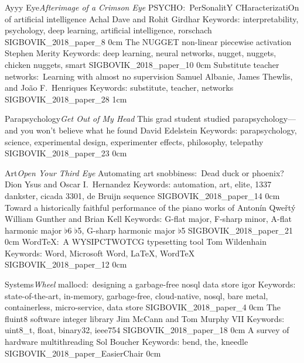 \addtrack
	{Ayyy Eye}{\textit{Afterimage of a Crimson Eye}}
\addpaper
	{PSYCHO:\ PerSonalitY CHaracterizatiOn of artificial intelligence}
	{Achal Dave and Rohit Girdhar}
	{Keywords: interpretability, psychology, deep learning, artificial intelligence, rorschach}
	{SIGBOVIK_2018_paper_8}
	{0cm}
	{}
\addpaper
	{The NUGGET non-linear piecewise activation}
	{Stephen Merity}
	{Keywords: deep learning, neural networks, nugget, nuggets, chicken nuggets, smart}
	{SIGBOVIK_2018_paper_10}
	{0cm}
	{}
\setlength{\evensidemargin}{0cm}
\addpaper
	{Substitute teacher networks:\ Learning with almost no supervision}
	{Samuel Albanie, James Thewlis, and Jo\~ao F.\ Henriques}
	{Keywords: substitute, teacher, networks}
	{SIGBOVIK_2018_paper_28}
	{1cm}
	{}
\setlength{\evensidemargin}{\mainevensidemargin}

\addtrack
	{Parapsychology}{\textit{Get Out of My Head}}
\addpaper
	{This grad student studied parapsychology---and you won't believe what he found}
	{David Edelstein}
	{Keywords: parapsychology, science, experimental design, experimenter effects, philosophy, telepathy}
	{SIGBOVIK_2018_paper_23}
	{0cm}
	{}

\addtrack
	{Art}{\textit{Open Your Third Eye}}
\addpaper
	{Automating art snobbiness:\ Dead duck or phoenix?}
	{Dion Ysus and Oscar I.\ Hernandez}
	{Keywords: automation, art, elite, 1337 dankster, cicada 3301, de Bruijn sequence}
	{SIGBOVIK_2018_paper_14}
	{0cm}
	{}
\addpaper
	{Toward a historically faithful performance of the piano works of Anton\'in Qwe\v{r}t\'y}
	{William Gunther and Brian Kell}
	{Keywords: G-flat major, F-sharp minor, A-flat harmonic major $\flat$6 $\flat$5, G-sharp harmonic major $\flat$5}
	{SIGBOVIK_2018_paper_21}
	{0cm}
	{}
\addpaper
	{WordTeX:\ A WYSIPCTWOTCG typesetting tool}
	{Tom Wildenhain}
	{Keywords: Word, Microsoft Word, LaTeX, WordTeX}
	{SIGBOVIK_2018_paper_12}
	{0cm}
	{}


\addtrack
	{Systems}{\textit{Wheel}}
\addpaper
	{mallocd:\ designing a garbage-free nosql data store}
	{igor}
	{Keywords: state-of-the-art, in-memory, garbage-free, cloud-native, nosql, bare metal, containerless, micro-service, data store}
	{SIGBOVIK_2018_paper_4}
	{0cm}
	{}
\addpaper
	{The fluint8 software integer library}
	{Jim McCann and Tom Murphy VII}
	{Keywords: uint8\_t, float, binary32, ieee754}
	{SIGBOVIK_2018_paper_18}
	{0cm}
	{}
\addpaper
	{A survey of hardware multithreading}
	{Sol Boucher}
	{Keywords: bend, the, kneedle}
	{SIGBOVIK_2018_paper_EasierChair}
	{0cm}
	{}

